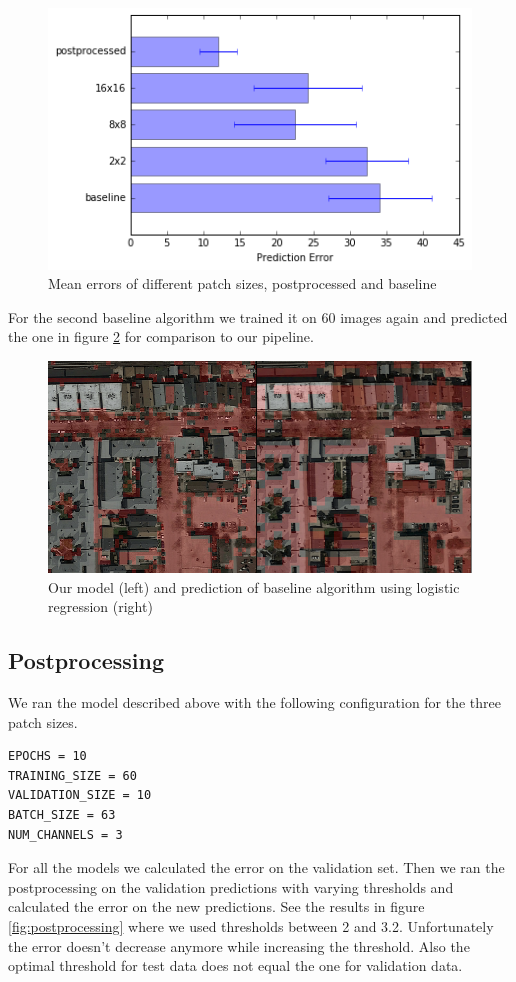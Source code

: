 \documentclass[10pt,conference,compsocconf]{IEEEtran}
\begin{document}
\begin{figure}
	\centering
	\includegraphics[width=.8\columnwidth]{pictures/baseline}
	\caption{Mean errors of different patch sizes, postprocessed and baseline}
	\label{fig:baseline}
\end{figure}

For the second baseline algorithm we trained it on 60 images again and predicted the one in figure \ref{fig:scikit} for comparison to our pipeline.

\begin{figure}
	\includegraphics[width=\columnwidth]{pictures/baseline1-comp}
	\caption{Our model (left) and prediction of baseline algorithm using logistic regression (right)}
	\label{fig:scikit}
\end{figure}

\subsection{Postprocessing}
We ran the model described above with the following configuration for the three patch sizes. 
\begin{lstlisting}
EPOCHS = 10
TRAINING_SIZE = 60
VALIDATION_SIZE = 10
BATCH_SIZE = 63
NUM_CHANNELS = 3
\end{lstlisting}
For all the models we calculated the error on the validation set. Then we ran the postprocessing on the validation predictions with varying thresholds and calculated the error on the new predictions. See the results in figure \ref{fig:postprocessing} where we used thresholds between 2 and 3.2. Unfortunately the error doesn't decrease anymore while increasing the threshold. Also the optimal threshold for test data does not equal the one for validation data.
\end{document}
